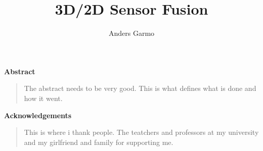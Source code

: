 \documentclass[twoside, a4paper, 12pt]{book}
\title{3D/2D Sensor Fusion}
\author{Anders Garmo}
\numberwithin{algorithm}{chapter}
\newenvironment{acknowledgements}
{\pagestyle{empty}
\begin{center}
\vspace*{1.5cm}
{\Large \bfseries Acknowledgements}
\end{center}
\vspace{0.5cm}
\begin{quote}}
{\end{quote}}
\newenvironment{abstracts} { \pagestyle{empty}
  \begin{center}
  \vspace*{1.5cm}
  {\Large \bfseries  Abstract}
  \end{center}
  \vspace{0.5cm}
   \begin{quote}}
{\end{quote}}
\begin{document}

\maketitle  %



\begin{abstracts}
    The abstract needs to be very good. This is what defines what is done and how it went.
\end{abstracts}

\frontmatter

\begin{acknowledgements}
    This is where i thank people. The teatchers and professors at my university and my
    girlfriend and family for supporting me.
\end{acknowledgements}




\setcounter{secnumdepth}{3} %
\setcounter{tocdepth}{3}    %
\tableofcontents            %



\listoffigures	%

\listoftables





\begin{multicols}{2} %
\begin{footnotesize} %

\printnomenclature[1.5cm] %
\label{nom} %

\end{footnotesize}
\end{multicols}
\end{document}

